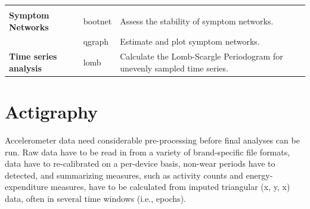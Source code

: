 \documentclass[]{book}
\begin{document}
\begin{longtable}[]{@{}lll@{}}
\begin{minipage}[t]{0.48\columnwidth}
\end{minipage}\tabularnewline
\begin{minipage}[t]{0.21\columnwidth}\raggedright\strut
\textbf{Symptom Networks}\strut
\end{minipage} & \begin{minipage}[t]{0.23\columnwidth}\raggedright\strut
bootnet\strut
\end{minipage} & \begin{minipage}[t]{0.48\columnwidth}\raggedright\strut
Assess the stability of symptom networks.\strut
\end{minipage}\tabularnewline
\begin{minipage}[t]{0.21\columnwidth}\raggedright\strut
\strut
\end{minipage} & \begin{minipage}[t]{0.23\columnwidth}\raggedright\strut
qgraph\strut
\end{minipage} & \begin{minipage}[t]{0.48\columnwidth}\raggedright\strut
Estimate and plot symptom networks.\strut
\end{minipage}\tabularnewline
\begin{minipage}[t]{0.21\columnwidth}\raggedright\strut
\textbf{Time series analysis}\strut
\end{minipage} & \begin{minipage}[t]{0.23\columnwidth}\raggedright\strut
lomb\strut
\end{minipage} & \begin{minipage}[t]{0.48\columnwidth}\raggedright\strut
Calculate the Lomb-Scargle Periodogram for unevenly sampled time
series.\strut
\end{minipage}\tabularnewline
\bottomrule
\end{longtable}

\section{Actigraphy}\label{actigraphy-1}


Accelerometer data need considerable pre-processing before final
analyses can be run. Raw data have to be read in from a variety of
brand-specific file formats, data have to re-calibrated on a per-device
basis, non-wear periods have to detected, and summarizing measures, such
as activity counts and energy-expenditure measures, have to be
calculated from imputed triangular (x, y, x) data, often in several time
windows (i.e., epochs).
\end{document}
